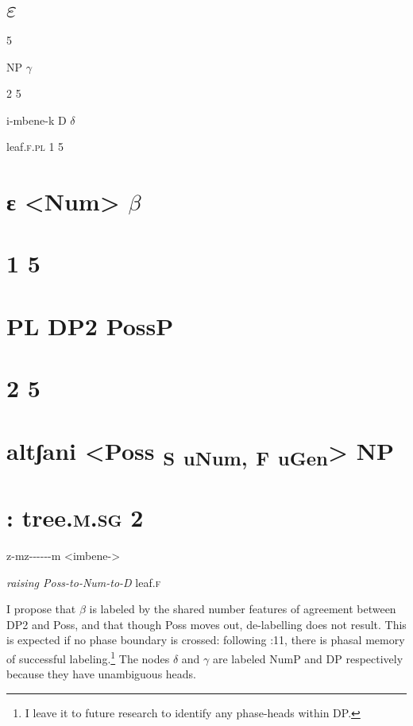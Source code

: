 \documentclass[output=paper
,modfonts
,nonflat]{langsci/langscibook}
\begin{document}
\section{                      ${\varepsilon}$} 
\label{bkm:Ref512337150}
5

NP        ${\gamma}$

2  5

i-mbene-k  D         ${\delta}$

leaf.\textsc{f.pl} 1     5

\section{                ɛ    <Num>                       ${\beta}$}
\section{                    1         5}
\section{                        PL          DP2             PossP}
\section{                                2    5}
\section{                              altʃani      <Poss \textsubscript{S} \textsubscript{uNum}\textsubscript{,} \textsubscript{F} \textsubscript{uGen}>\textsubscript{}   NP}
\section{                :         tree.\textsc{m.sg} 2}

z-mz-{}-{}-{}-{}-{}-m                 <imbene->

\textit{raising Poss-to-Num-to-D}                     leaf.\textsc{f}

I propose that ${\beta}$ is labeled by the shared number features of agreement between DP2 and Poss, and that though Poss moves out, de-labelling does not result. This is expected if no phase boundary is crossed: following \citealt{Chomsky2015}:11, there is phasal memory of successful labeling.\footnote{I leave it to future research to identify any phase-heads within DP.}  The nodes ${\delta}$ and ${\gamma}$ are labeled NumP and DP respectively because they have unambiguous heads. 
\end{document}
